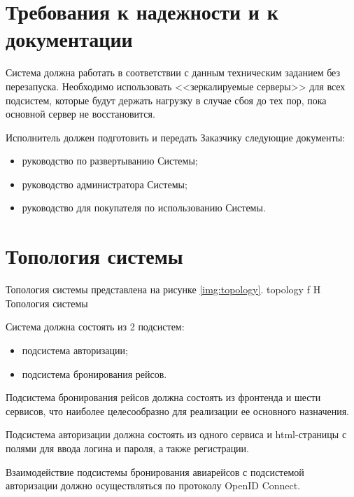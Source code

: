 \section*{Требования к надежности и к документации}

Система должна работать в соответствии с данным техническим заданием
без перезапуска. Необходимо использовать <<зеркалируемые серверы>> для всех подсистем, которые будут держать нагрузку в случае сбоя до тех пор, пока основной сервер не восстановится.

Исполнитель должен подготовить и передать Заказчику следующие документы:
\begin{itemize}
    \item руководство по развертыванию Системы;
    \item руководство администратора Системы;
    \item руководство для покупателя по использованию Системы.
\end{itemize}

\section*{Топология системы}  \label{topology}

Топология системы представлена на рисунке \ref{img:topology}.
{topology} %
{f} %
{H} %
{\textwidth} %
{Топология системы} %

Система должна состоять из 2 подсистем:
\begin{itemize}
    \item подсистема авторизации;
    \item подсистема бронирования рейсов.
\end{itemize}

Подсистема бронирования рейсов должна состоять из фронтенда и шести сервисов, что наиболее целесообразно для реализации ее основного назначения. 

Подсистема авторизации должна состоять из одного сервиса и html-страницы с полями для ввода логина и пароля, а также регистрации. 

Взаимодействие подсистемы бронирования авиарейсов с подсистемой авторизации должно осуществляться по протоколу OpenID Connect.

